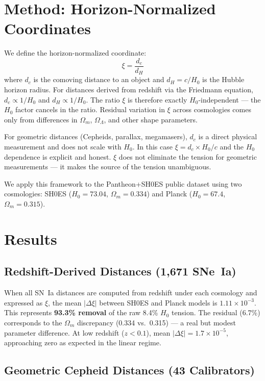 \documentclass[12pt,a4paper]{article}
\begin{document}
\section{Method: Horizon-Normalized Coordinates}

We define the horizon-normalized coordinate:
\begin{equation}
    \xi = \frac{d_c}{d_H}
\end{equation}
where $d_c$ is the comoving distance to an object and $d_H = c/H_0$ is the
Hubble horizon radius. For distances derived from redshift via the Friedmann
equation, $d_c \propto 1/H_0$ and $d_H \propto 1/H_0$. The ratio $\xi$ is
therefore exactly $H_0$-independent --- the $H_0$ factor cancels in the ratio.
Residual variation in $\xi$ across cosmologies comes only from differences in
$\Omega_m$, $\Omega_\Lambda$, and other shape parameters.

For geometric distances (Cepheids, parallax, megamasers), $d_c$ is a direct
physical measurement and does not scale with $H_0$. In this case $\xi = d_c
\times H_0/c$ and the $H_0$ dependence is explicit and honest. $\xi$ does not
eliminate the tension for geometric measurements --- it makes the source of the
tension unambiguous.

We apply this framework to the Pantheon+SH0ES public dataset \citep{brout2022}
using two cosmologies: SH0ES ($H_0 = 73.04$, $\Omega_m = 0.334$) and Planck
($H_0 = 67.4$, $\Omega_m = 0.315$).

\section{Results}

\subsection{Redshift-Derived Distances (1,671 SNe~Ia)}

When all SN~Ia distances are computed from redshift under each cosmology and
expressed as $\xi$, the mean $|\Delta\xi|$ between SH0ES and Planck models is
$1.11 \times 10^{-3}$. This represents \textbf{93.3\% removal} of the raw
8.4\% $H_0$ tension. The residual (6.7\%) corresponds to the $\Omega_m$
discrepancy (0.334 vs.\ 0.315) --- a real but modest parameter difference. At
low redshift ($z < 0.1$), mean $|\Delta\xi| = 1.7 \times 10^{-5}$, approaching
zero as expected in the linear regime.

\subsection{Geometric Cepheid Distances (43 Calibrators)}
\end{document}
